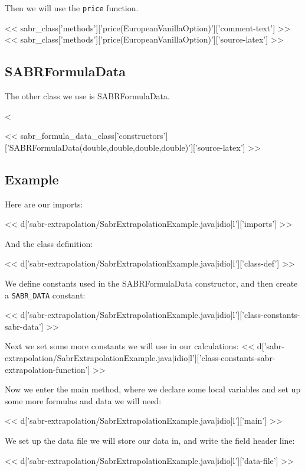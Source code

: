 Then we will use the \verb|price| function.

<< sabr_class['methods']['price(EuropeanVanillaOption)']['comment-text'] >>
<< sabr_class['methods']['price(EuropeanVanillaOption)']['source-latex'] >>

\subsection{SABRFormulaData}

The other class we use is SABRFormulaData.

<%

<< sabr_formula_data_class['constructors']['SABRFormulaData(double,double,double,double)']['source-latex'] >>

\subsection{Example}

Here are our imports:

<< d['sabr-extrapolation/SabrExtrapolationExample.java|idio|l']['imports'] >>

And the class definition:

<< d['sabr-extrapolation/SabrExtrapolationExample.java|idio|l']['class-def'] >>

We define constants used in the SABRFormulaData constructor, and then create a
\verb|SABR_DATA| constant:

<< d['sabr-extrapolation/SabrExtrapolationExample.java|idio|l']['class-constants-sabr-data'] >>

Next we set some more constants we will use in our calculations:
<< d['sabr-extrapolation/SabrExtrapolationExample.java|idio|l']['class-constants-sabr-extrapolation-function'] >>

Now we enter the main method, where we declare some local variables and set up
some more formulas and data we will need:

<< d['sabr-extrapolation/SabrExtrapolationExample.java|idio|l']['main'] >>

We set up the data file we will store our data in, and write the field header line:

<< d['sabr-extrapolation/SabrExtrapolationExample.java|idio|l']['data-file'] >>

